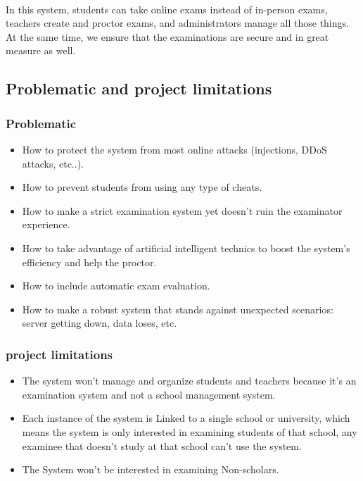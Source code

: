 \documentclass[]{uc2pfecaneva}
\begin{document}
\paragraph{}
	In this system, students can take online exams instead of in-person exams, teachers create and proctor exams, and administrators manage all those things. At the same time, we ensure that the examinations are secure and in great measure as well.

\subsection{Problematic and project limitations}
	\subsubsection{Problematic}

	\begin{itemize}
		\item How to protect the system from most online attacks (injections, DDoS attacks, etc..).
		\item How to prevent students from using any type of cheats.
		\item How to make a strict examination system yet doesn't ruin the examinator experience.
		\item How to take advantage of artificial intelligent technics to boost the system’s efficiency and help the proctor.
		\item How to include automatic exam evaluation.
		\item How to make a robust system that stands against unexpected scenarios: server getting down, data loses, etc.
\end{itemize}


	\subsubsection{project limitations}

	\begin{itemize}
		\item The system won't manage and organize students and teachers because it's an examination system and not a school management system.
		\item Each instance of the system is Linked to a single school or university, which means the system is only interested in examining students of that school, any examinee that doesn't study at that school can’t use the system.
		\item The System won't be interested in examining Non-scholars.
	\end{itemize}
\end{document}
